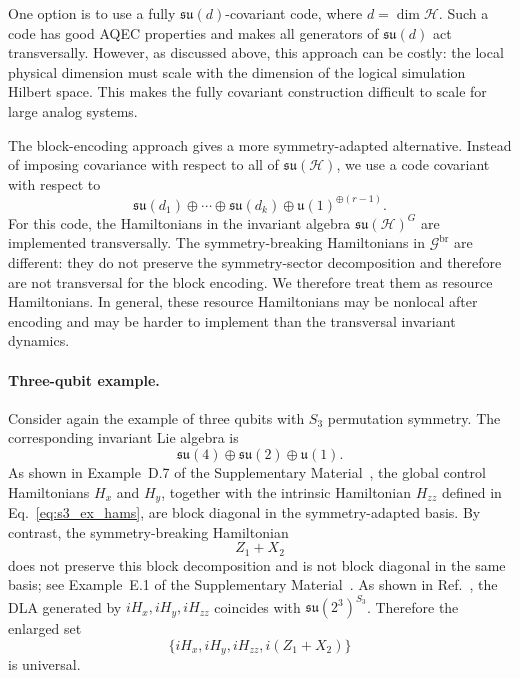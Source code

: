 \documentclass[10pt,twocolumn,superscriptaddress,aps,amsmath,amssymb,citeautoscript,floatfix,prx]{revtex4-2}
\newcounter{alg}
\theoremstyle{plain}
\theoremstyle{plain}
\theoremstyle{plain}
\theoremstyle{plain}
\theoremstyle{plain}
\theoremstyle{plain}
\begin{document}
One option is to use a fully $\mathfrak{su}(d)$-covariant code, where $d=\dim\mathcal H$. Such a code has good AQEC properties and makes all generators of $\mathfrak{su}(d)$ act transversally. However, as discussed above, this approach can be costly: the local physical dimension must scale with the dimension of the logical simulation Hilbert space. This makes the fully covariant construction difficult to scale for large analog systems.

The block-encoding approach gives a more symmetry-adapted alternative. Instead of imposing covariance with respect to all of $\mathfrak{su}(\mathcal H)$, we use a code covariant with respect to
$$
\mathfrak{su}(d_1)
\oplus
\cdots
\oplus
\mathfrak{su}(d_k)
\oplus
\mathfrak{u}(1)^{\oplus(r-1)} .
$$
For this code, the Hamiltonians in the invariant algebra $\mathfrak{su}(\mathcal H)^G$ are implemented transversally. The symmetry-breaking Hamiltonians in $\mathcal G^{\mathrm{br}}$ are different: they do not preserve the symmetry-sector decomposition and therefore are not transversal for the block encoding. We therefore treat them as resource Hamiltonians. In general, these resource Hamiltonians may be nonlocal after encoding and may be harder to implement than the transversal invariant dynamics.

\paragraph{Three-qubit example.}

Consider again the example of three qubits with $S_3$ permutation symmetry. The corresponding invariant Lie algebra is
$$
\mathfrak{su}(4)
\oplus
\mathfrak{su}(2)
\oplus
\mathfrak{u}(1).
$$
As shown in Example~D.7 of the Supplementary Material~\cite{SuppMat}, the global control Hamiltonians $H_x$ and $H_y$, together with the intrinsic Hamiltonian $H_{zz}$ defined in Eq.~\eqref{eq:s3_ex_hams}, are block diagonal in the symmetry-adapted basis. By contrast, the symmetry-breaking Hamiltonian
$$
Z_1+X_2
$$
does not preserve this block decomposition and is not block diagonal in the same basis; see Example~E.1 of the Supplementary Material~\cite{SuppMat}. As shown in Ref.~\cite{Albertini2018}, the DLA generated by ${iH_x,iH_y,iH_{zz}}$ coincides with $\mathfrak{su}(2^3)^{S_3}$. Therefore the enlarged set
$$
\{iH_x,iH_y,iH_{zz},i(Z_1+X_2)\}
$$
is universal.
\end{document}
